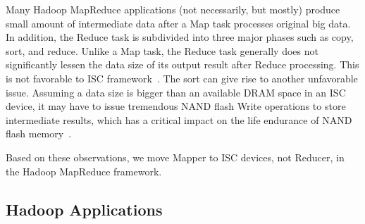 Many Hadoop MapReduce applications (not necessarily, but mostly) produce small amount of intermediate data after a Map task processes original big data. In addition, the Reduce task is subdivided into three major phases such as copy, sort, and reduce. Unlike a Map task, the Reduce task generally does not significantly lessen the data size of its output result after Reduce processing. This is not favorable to ISC framework~\cite{SmartSSD:SIGMOD:2013}. The sort can give rise to another unfavorable issue. Assuming a data size is bigger than an available DRAM space in an ISC device, it may have to issue tremendous NAND flash Write operations to store intermediate results, which has a critical impact on the life endurance of NAND flash memory~\cite{SSDDesignTradeOff:ATC:2008,IPL:SIGMOD:2007,HotData:MSST:2011,HotDataTrap:ACR:2013}. 

Based on these observations, we move Mapper to ISC devices, not Reducer, in the Hadoop MapReduce framework.






\subsection{Hadoop Applications}\label{sec:application}

